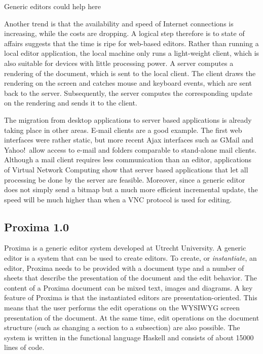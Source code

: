 \documentclass[10pt]{article}
\begin{document}
Generic editors could help here

\bc
Another trend is that the availability and speed of Internet connections is increasing, while the costs are dropping. A logical step therefore is to state of affairs suggests that the time is ripe for web-based editors. Rather than running a local editor application, the local machine only runs a light-weight client, which is also suitable for devices with little processing power. A server computes a rendering of the document, which is sent to the local client. The client draws the rendering on the screen and catches mouse and keyboard events, which are sent back to the server. Subsequently, the server computes the corresponding update on the rendering and sends it to the client.

The migration from desktop applications to server based applications is already taking place in other areas. E-mail clients are a good example. The first web interfaces were rather static, but more recent Ajax interfaces such as GMail and Yahoo!\ allow access to e-mail and folders comparable to stand-alone mail clients. Although a mail client requires less communication than an editor, applications of Virtual Network Computing show that server based applications that let all processing be done by the server are feasible. Moreover, since a generic editor does not simply send a bitmap but a much more efficient incremental update, the speed will be much higher than when a VNC protocol is used for editing. 
\ec

\subsection{Proxima 1.0}

Proxima is a generic editor system developed at Utrecht University. A generic editor is a system that can be used to create editors. To create, or {\em instantiate}, an editor, Proxima needs to be provided with a document type and a number of sheets that describe the presentation of the document and the edit behavior. The content of a Proxima document can be mixed text, images and diagrams. A key feature of Proxima is that the instantiated editors are presentation-oriented. This means that the user performs the edit operations on the WYSIWYG screen presentation of the document. At the same time, edit operations on the document structure (such as changing a section to a subsection) are also possible. The system is written in the functional language Haskell and consists of about 15000 lines of code.
\end{document}
